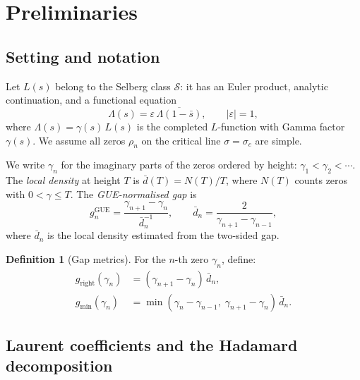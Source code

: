 \documentclass[11pt,a4paper]{article}
\theoremstyle{plain}
\theoremstyle{definition}
\newtheorem{definition}[theorem]{Definition}
\newcommand{\La}{\Lambda}
\begin{document}
\section{Preliminaries}
\label{sec:prelim}

\subsection{Setting and notation}

Let $L(s)$ belong to the Selberg class $\mathcal{S}$: it has an
Euler product, analytic continuation, and a functional equation
\begin{equation}\label{eq:FE}
  \La(s) = \varepsilon\, \overline{\La(1 - \bar{s})},
  \qquad |\varepsilon| = 1,
\end{equation}
where $\La(s) = \gamma(s)\, L(s)$ is the completed $L$-function
with Gamma factor $\gamma(s)$.  We assume all zeros $\rho_n$ on
the critical line $\sigma = \sigma_c$ are simple.

We write $\gamma_n$ for the imaginary parts of the zeros ordered
by height: $\gamma_1 < \gamma_2 < \cdots$.  The \emph{local density}
at height $T$ is $\bar{d}(T) = N(T)/T$, where $N(T)$ counts zeros
with $0 < \gamma \le T$.  The \emph{GUE-normalised gap} is
\begin{equation}\label{eq:gap_norm}
  g_n^{\mathrm{GUE}} = \frac{\gamma_{n+1} - \gamma_n}
  {\bar{d}_n^{-1}}, \qquad
  \bar{d}_n = \frac{2}{\gamma_{n+1} - \gamma_{n-1}},
\end{equation}
where $\bar{d}_n$ is the local density estimated from the
two-sided gap.

\begin{definition}[Gap metrics]\label{def:gaps}
For the $n$-th zero $\gamma_n$, define:
\begin{align}
  g_{\mathrm{right}}(\gamma_n) &= (\gamma_{n+1} - \gamma_n)\,\bar{d}_n,
  \label{eq:gap_right}\\
  g_{\min}(\gamma_n) &= \min(\gamma_n - \gamma_{n-1},\;
  \gamma_{n+1} - \gamma_n)\,\bar{d}_n.
  \label{eq:gap_min}
\end{align}
\end{definition}

\subsection{Laurent coefficients and the Hadamard decomposition}
\end{document}
